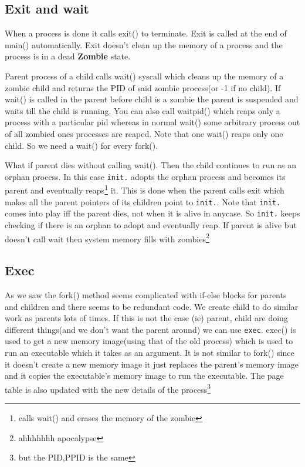 \documentclass[12pt]{article}
\newcommand{\tbox}[1]{\noindent\fbox{\parbox{\textwidth}{#1}}}
\begin{document}
\newpage
\noindent\tbox{
    \begin{center}
    \textbf{\Huge Lecture 4}
    \end{center}
}
\subsection{Exit and wait}
When a process is done it calls exit() to terminate. Exit is called at the end of main() automatically.
Exit doesn't clean up the memory of a process and the process is in a dead \textbf{Zombie} state.

Parent process of a child calls wait() syscall which cleans up the memory of a zombie child and returns the PID of said zombie process(or -1 if no child). If wait() is called in the
parent before child is a zombie the parent is suspended and waits till the child is 
running. You can also call waitpid() which reaps only a process with a particular pid whereas in normal 
wait() some arbitrary process out of all zombied ones processes are reaped. Note that one wait() reaps only one child. So we need a wait() for every fork().


What if parent dies without calling wait(). Then the child continues to run as an orphan process. In this case \texttt{init.} 
adopts the orphan process and becomes its parent and eventually reaps\footnote{calls wait() and erases the memory of the zombie} it. This is done when the parent calls exit which makes all the parent
pointers of its children point to \texttt{init.}. Note that \texttt{init.} comes into play iff the parent dies, not when it is alive in anycase. So \texttt{init.} keeps
checking if there is an orphan to adopt and eventually reap. If parent is alive but doesn't call wait then system memory fills with zombies\footnote{ahhhhhhh apocalypse}


\subsection{Exec}
As we saw the fork() method seems complicated with if-else blocks for parents and children and there seems to be redundant code. We create
child to do similar work as parents lots of times. If this is not the case (ie) parent, child are doing different things(and we don't want the parent around) we can use \texttt{exec}.
exec() is used to get a new memory image(using that of the old process) which is used to run an executable which it takes as an argument. It is not similar to fork() since it doesn't create a new memory image
it just replaces the parent's memory image and it copies the executable's memory image to run the executable. The page table is also updated with the new details of the process\footnote{but the PID,PPID is the same}
\end{document}
